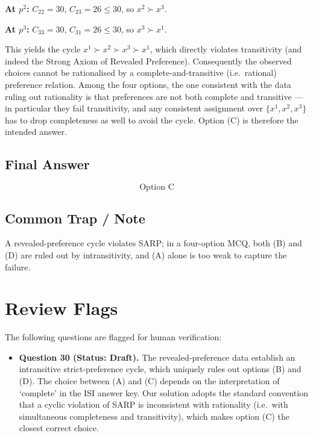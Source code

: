 \documentclass[11pt]{article}
\begin{document}
\textbf{At $p^{2}$:} $C_{22}=30$, $C_{23}=26\le 30$, so $x^{2}\succ x^{3}$.

\textbf{At $p^{3}$:} $C_{33}=30$, $C_{31}=26\le 30$, so $x^{3}\succ x^{1}$.

This yields the cycle $x^{1}\succ x^{2}\succ x^{3}\succ x^{1}$, which directly violates transitivity (and indeed the Strong Axiom of Revealed Preference). Consequently the observed choices cannot be rationalised by a complete-and-transitive (i.e.\ rational) preference relation. Among the four options, the one consistent with the data ruling out rationality is that preferences are not both complete and transitive --- in particular they fail transitivity, and any consistent assignment over $\{x^{1},x^{2},x^{3}\}$ has to drop completeness as well to avoid the cycle. Option (C) is therefore the intended answer.

\subsection*{Final Answer}
\[
\boxed{\text{Option C}}
\]

\subsection*{Common Trap / Note}
A revealed-preference cycle violates SARP; in a four-option MCQ, both (B) and (D) are ruled out by intransitivity, and (A) alone is too weak to capture the failure.

\section*{Review Flags}

The following questions are flagged for human verification:

\begin{itemize}[leftmargin=*]
\item \textbf{Question 30 (Status: Draft).} The revealed-preference data establish an intransitive strict-preference cycle, which uniquely rules out options (B) and (D). The choice between (A) and (C) depends on the interpretation of `complete' in the ISI answer key. Our solution adopts the standard convention that a cyclic violation of SARP is inconsistent with rationality (i.e.\ with simultaneous completeness and transitivity), which makes option (C) the closest correct choice.
\end{itemize}
\end{document}
